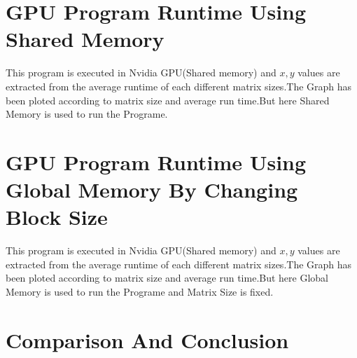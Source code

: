 \documentclass[12pt,oneside,a4paper]{article}
\begin{document}
	\section{GPU Program Runtime Using Shared Memory}

	\par
	This program is executed in Nvidia GPU(Shared memory) and $x,y$ values are extracted from the average runtime of each different matrix sizes.The Graph has been ploted according to matrix size and average run time.But here Shared Memory is used to run the Programe.
	\hfill \break





	\newpage

	\section{GPU Program Runtime Using Global Memory By Changing Block Size}

	\par
	This program is executed in Nvidia GPU(Shared memory) and $x,y$ values are extracted from the average runtime of each different matrix sizes.The Graph has been ploted according to matrix size and average run time.But here Global Memory is used to run the Programe and Matrix Size is fixed.
	\hfill \break







	\newpage

	\section{Comparison And Conclusion}
\end{document}
